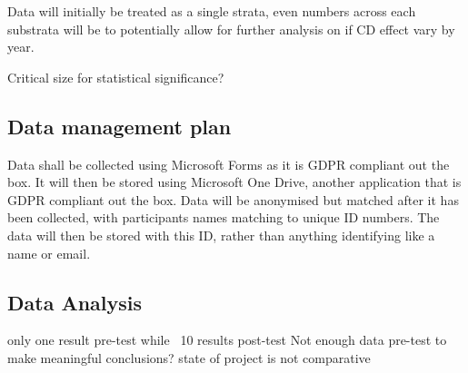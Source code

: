 \documentclass[lettersize,journal]{IEEEtran}
\begin{document}
        Data will initially be treated as a single strata, even numbers across each substrata will be to potentially allow for further analysis on if CD effect vary by year.

        Critical size for statistical significance?
    
    \subsection{Data management plan}
        Data shall be collected using Microsoft Forms as it is GDPR compliant out the box. It will then be stored using Microsoft One Drive, another application that is GDPR compliant out the box.
        Data will be anonymised but matched after it has been collected, with participants names matching to unique ID numbers. The data will then be stored with this ID, rather than anything identifying like a name or email.
    
    \subsection{Data Analysis}
        only one result pre-test while ~10 results post-test
        Not enough data pre-test to make meaningful conclusions?
        state of project is not comparative
\end{document}
